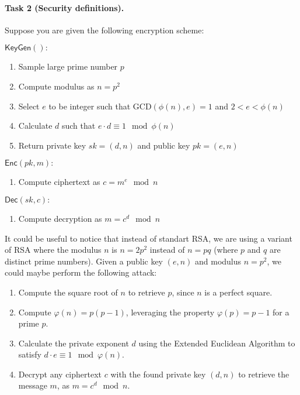 \documentclass{article}
\begin{document}
\paragraph{Task 2 (Security definitions).} Suppose you are given the following encryption scheme:
\begin{tcolorbox}[colback=white]
\begin{multicols}{2}
$\mathsf{KeyGen}():$
\begin{enumerate}
    \item Sample large prime number $p$ 
    \item Compute modulus as $n = p^2$
    \item Select $e$ to be integer such that $\text{GCD}(\phi(n), e) = 1$ and $2 < e < \phi(n)$
    \item Calculate $d$ such that $e \cdot d \equiv 1 \mod \phi(n)$
    \item Return private key  $sk = (d,n)$ and public key $pk = (e,n)$
\end{enumerate}

\columnbreak
$\mathsf{Enc}(pk,m):$
\begin{enumerate}
    \item Compute ciphertext as $c = m^e \mod n$ 
\end{enumerate}

$\mathsf{Dec}(sk,c):$
\begin{enumerate}
    \item Compute decryption as $m = c^d \mod n$
\end{enumerate}
\end{multicols}
\end{tcolorbox}

It could be useful to notice that instead of standart RSA, we are using a variant of RSA where the modulus $n$ is $n = 2p^2$ instead of $n = pq$ (where $p$ and $q$ are distinct prime numbers).
Given a public key \( (e, n) \) and modulus \( n = p^2 \), we could maybe perform the following attack:

\begin{enumerate}
    \item Compute the square root of \( n \) to retrieve \( p \), since \( n \) is a perfect square.
    \item Compute \( \varphi(n) = p(p-1) \), leveraging the property \( \varphi(p) = p-1 \) for a prime \( p \).
    \item Calculate the private exponent \( d \) using the Extended Euclidean Algorithm to satisfy \( d \cdot e \equiv 1 \mod \varphi(n) \).
    \item Decrypt any ciphertext \( c \) with the found private key \( (d, n) \) to retrieve the message \( m \), as \( m = c^d \mod n \).
\end{enumerate}
\end{document}
